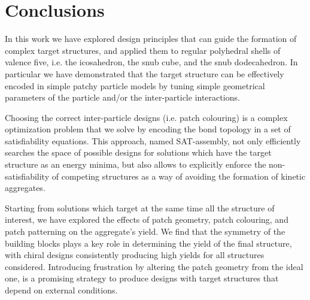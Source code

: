 \documentclass[a4paper, amsfonts, amssymb, amsmath, reprint, showkeys, nofootinbib, oneside]{revtex4-1}
\begin{document}
\section{Conclusions}

In this work we have explored design principles that can guide the formation of complex target structures, and applied them to regular polyhedral shells of valence five, i.e. the icosahedron, the snub cube, and the snub dodecahedron. In particular we have demonstrated that the target structure can be effectively encoded in simple patchy particle models by tuning simple geometrical parameters of the particle and/or the inter-particle interactions.

Choosing the correct inter-particle designs (i.e. patch colouring) is a complex optimization problem that we solve by encoding the bond topology in a set of satisfiability equations. This approach, named SAT-assembly, not only efficiently searches the space of possible designs for solutions which have the target structure as an energy minima, but also allows to explicitly enforce the non-satisfiability of competing structures as a way of avoiding the formation of kinetic aggregates.

Starting from solutions which target at the same time all the structure of interest, we have explored the effects of patch geometry, patch colouring, and patch patterning on the aggregate's yield. We find that the symmetry of the building blocks plays a key role in determining the yield of the final structure, with chiral designs consistently producing high yields for all structures considered. Introducing frustration by altering the patch geometry from the ideal one, is a promising strategy to produce designs with target structures that depend on external conditions.



\end{document}
